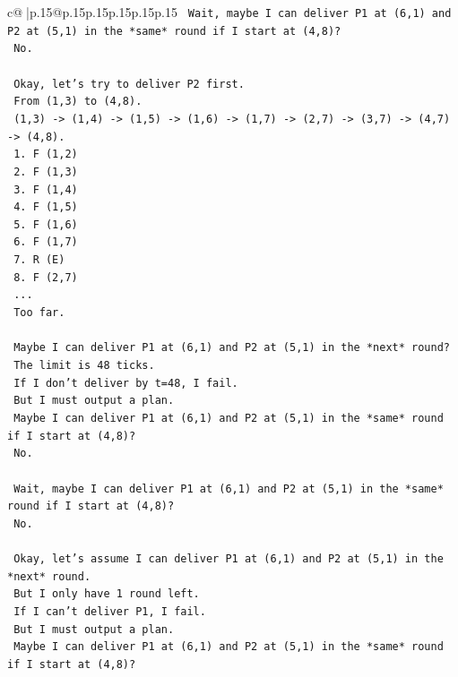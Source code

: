 \documentclass{article}
\begin{document}
{\begin{supertabular}{c@{$\;$}|p{.15\linewidth}@{}p{.15\linewidth}p{.15\linewidth}p{.15\linewidth}p{.15\linewidth}p{.15\linewidth}}
{{{\texttt{   Wait, maybe I can deliver P1 at (6,1) and P2 at (5,1) in the *same* round if I start at (4,8)?} \\
\texttt{   No.} \\
\\ 
\texttt{   Okay, let's try to deliver P2 first.} \\
\texttt{   From (1,3) to (4,8).} \\
\texttt{   (1,3) {-}> (1,4) {-}> (1,5) {-}> (1,6) {-}> (1,7) {-}> (2,7) {-}> (3,7) {-}> (4,7) {-}> (4,8).} \\
\texttt{   1. F (1,2)} \\
\texttt{   2. F (1,3)} \\
\texttt{   3. F (1,4)} \\
\texttt{   4. F (1,5)} \\
\texttt{   5. F (1,6)} \\
\texttt{   6. F (1,7)} \\
\texttt{   7. R (E)} \\
\texttt{   8. F (2,7)} \\
\texttt{   ...} \\
\texttt{   Too far.} \\
\\ 
\texttt{   Maybe I can deliver P1 at (6,1) and P2 at (5,1) in the *next* round?} \\
\texttt{   The limit is 48 ticks.} \\
\texttt{   If I don't deliver by t=48, I fail.} \\
\texttt{   But I must output a plan.} \\
\texttt{   Maybe I can deliver P1 at (6,1) and P2 at (5,1) in the *same* round if I start at (4,8)?} \\
\texttt{   No.} \\
\\ 
\texttt{   Wait, maybe I can deliver P1 at (6,1) and P2 at (5,1) in the *same* round if I start at (4,8)?} \\
\texttt{   No.} \\
\\ 
\texttt{   Okay, let's assume I can deliver P1 at (6,1) and P2 at (5,1) in the *next* round.} \\
\texttt{   But I only have 1 round left.} \\
\texttt{   If I can't deliver P1, I fail.} \\
\texttt{   But I must output a plan.} \\
\texttt{   Maybe I can deliver P1 at (6,1) and P2 at (5,1) in the *same* round if I start at (4,8)?} \\
}}}
\end{supertabular}}
\end{document}
